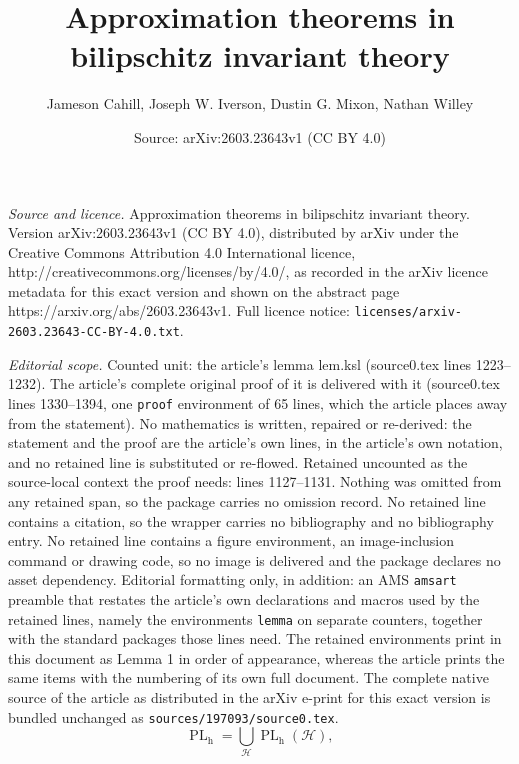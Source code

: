 \documentclass[10pt,a4paper]{amsart}
\title{Approximation theorems in bilipschitz invariant theory}
\author{Jameson Cahill, Joseph W. Iverson, Dustin G. Mixon, Nathan Willey}
\date{Source: arXiv:2603.23643v1 (CC BY 4.0)}
\begin{document}
\maketitle

\noindent\emph{Source and licence.} Approximation theorems in bilipschitz invariant theory. Version arXiv:2603.23643v1 (CC BY 4.0), distributed by arXiv under the Creative Commons Attribution 4.0 International licence, http://creativecommons.org/licenses/by/4.0/, as recorded in the arXiv licence metadata for this exact version and shown on the abstract page https://arxiv.org/abs/2603.23643v1. Full licence notice: \texttt{licenses/arxiv-2603.23643-CC-BY-4.0.txt}.\par\smallskip

\noindent\textit{Editorial scope.} Counted unit: the article's lemma lem.ksl (source0.tex lines 1223--1232). The article's complete original proof of it is delivered with it (source0.tex lines 1330--1394, one \texttt{proof} environment of 65 lines, which the article places away from the statement). No mathematics is written, repaired or re-derived: the statement and the proof are the article's own lines, in the article's own notation, and no retained line is substituted or re-flowed.  Retained uncounted as the source-local context the proof needs: lines 1127--1131.  Nothing was omitted from any retained span, so the package carries no omission record.  No retained line contains a citation, so the wrapper carries no bibliography and no bibliography entry.  No retained line contains a figure environment, an image-inclusion command or drawing code, so no image is delivered and the package declares no asset dependency.  Editorial formatting only, in addition: an AMS \texttt{amsart} preamble that restates the article's own declarations and macros used by the retained lines, namely the environments \texttt{lemma} on separate counters, together with the standard packages those lines need.  The retained environments print in this document as Lemma 1 in order of appearance, whereas the article prints the same items with the numbering of its own full document.  The complete native source of the article as distributed in the arXiv e-print for this exact version is bundled unchanged as \texttt{sources/197093/source0.tex}.
\begin{equation}
\label{eq.stratification of PL}
\operatorname{PL}_{\operatorname{h}}
=\bigcup_\mathcal{H}\operatorname{PL}_{\operatorname{h}}(\mathcal{H}),
\end{equation}
\end{document}
